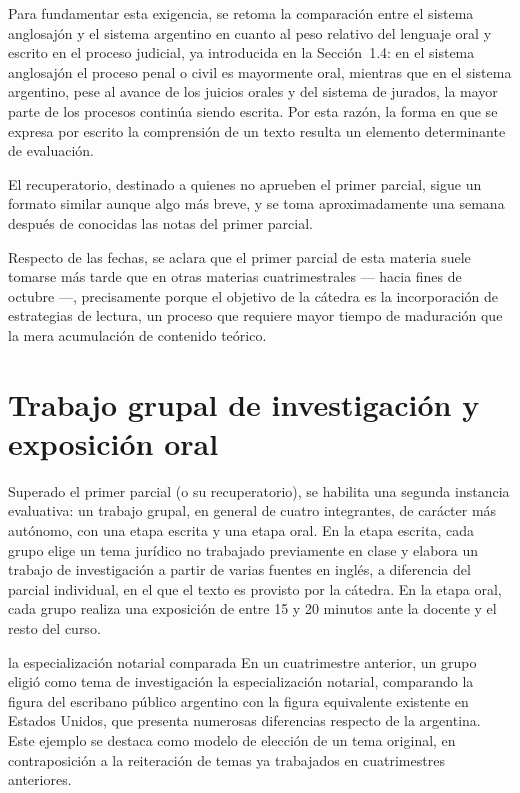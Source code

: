 \documentclass[12pt,oneside]{book}
\begin{document}
Para fundamentar esta exigencia, se retoma la comparación entre el sistema anglosajón y el sistema argentino en cuanto al peso relativo del lenguaje oral y escrito en el proceso judicial, ya introducida en la Sección~1.4: en el sistema anglosajón el proceso penal o civil es mayormente oral, mientras que en el sistema argentino, pese al avance de los juicios orales y del sistema de jurados, la mayor parte de los procesos continúa siendo escrita. Por esta razón, la forma en que se expresa por escrito la comprensión de un texto resulta un elemento determinante de evaluación.

El recuperatorio, destinado a quienes no aprueben el primer parcial, sigue un formato similar aunque algo más breve, y se toma aproximadamente una semana después de conocidas las notas del primer parcial.

Respecto de las fechas, se aclara que el primer parcial de esta materia suele tomarse más tarde que en otras materias cuatrimestrales --- hacia fines de octubre ---, precisamente porque el objetivo de la cátedra es la incorporación de estrategias de lectura, un proceso que requiere mayor tiempo de maduración que la mera acumulación de contenido teórico.

\section{Trabajo grupal de investigación y exposición oral}

Superado el primer parcial (o su recuperatorio), se habilita una segunda instancia evaluativa: un trabajo grupal, en general de cuatro integrantes, de carácter más autónomo, con una etapa escrita y una etapa oral. En la etapa escrita, cada grupo elige un tema jurídico no trabajado previamente en clase y elabora un trabajo de investigación a partir de varias fuentes en inglés, a diferencia del parcial individual, en el que el texto es provisto por la cátedra. En la etapa oral, cada grupo realiza una exposición de entre 15 y 20 minutos ante la docente y el resto del curso.

\begin{example}{la especialización notarial comparada}
En un cuatrimestre anterior, un grupo eligió como tema de investigación la especialización notarial, comparando la figura del escribano público argentino con la figura equivalente existente en Estados Unidos, que presenta numerosas diferencias respecto de la argentina. Este ejemplo se destaca como modelo de elección de un tema original, en contraposición a la reiteración de temas ya trabajados en cuatrimestres anteriores.
\end{example}
\end{document}
